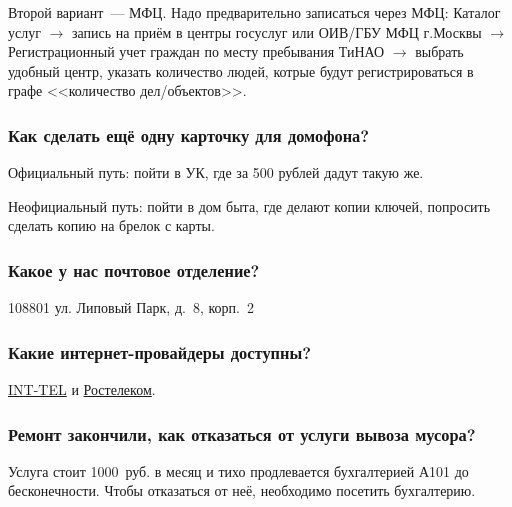 \documentclass[10pt,landscape,a4paper]{article}
\begin{document}
\begin{multicols*}{3}
  Второй вариант~--- МФЦ. Надо предварительно записаться через МФЦ: Каталог услуг $\rightarrow$ запись на приём в центры госуслуг или
  ОИВ/ГБУ МФЦ г.Москвы $\rightarrow$ Регистрационный учет граждан по месту пребывания ТиНАО $\rightarrow$ выбрать удобный центр, указать
  количество людей, котрые будут регистрироваться в графе <<количество дел/объектов>>.

  \subsubsection*{Как сделать ещё одну карточку для домофона?}
  Официальный путь: пойти в УК, где за 500 рублей дадут такую же.

  Неофициальный путь: пойти в дом быта, где делают копии ключей, попросить сделать копию на брелок с карты.

  \subsubsection*{Какое у нас почтовое отделение?}

  108801 ул. Липовый Парк, д.~8, корп.~2

  \subsubsection*{Какие интернет-провайдеры доступны?}

  \href{http://int-tel.net/}{INT-TEL} и \href{https://moscow.rt.ru/}{Ростелеком}.

  \subsubsection*{Ремонт закончили, как отказаться от услуги вывоза мусора?}

  Услуга стоит 1000~руб. в месяц и тихо продлевается бухгалтерией А101 до бесконечности. Чтобы отказаться от неё, необходимо посетить
  бухгалтерию.

\end{multicols*}
\end{document}
